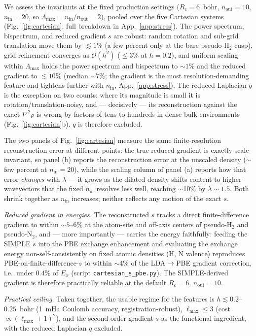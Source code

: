 \documentclass[aps,prb,reprint,superscriptaddress,nofootinbib]{revtex4-2}
\newcommand{\Rc}{R_{c}}
\newcommand{\nin}{n_{\mathrm{in}}}
\newcommand{\nout}{n_{\mathrm{out}}}
\begin{document}
We assess the invariants at the fixed production settings ($\Rc=6$~bohr, $\nout=10$,
$\nin=20$, so $\Lambda_{\max}=\nin/\nout=2$), pooled over the five Cartesian systems
(Fig.~\ref{fig:cartesian}; full breakdown in App.~\ref{app:stress}). The power spectrum,
bispectrum, and reduced gradient $s$ are robust: random rotation and sub-grid translation
move them by $\lesssim1\%$ (a few percent only at the bare pseudo-H$_2$ cusp), grid
refinement converges as $\mathcal O(h^2)$ ($\le3\%$ at $h=0.2$), and uniform scaling
within $\Lambda_{\max}$ holds the power spectrum and bispectrum to $\sim1\%$ and the
reduced gradient to $\lesssim10\%$ (median $\sim7\%$; the gradient is the most
resolution-demanding feature and tightens further with $\nin$, App.~\ref{app:stress}).
The reduced Laplacian $q$ is the exception on two counts: where its magnitude is small it
is rotation/translation-noisy, and --- decisively --- its reconstruction against the
exact $\nabla^2\rho$ is wrong by factors of tens to hundreds in dense bulk environments
(Fig.~\ref{fig:cartesian}b). $q$ is therefore excluded.

The two panels of Fig.~\ref{fig:cartesian} measure the same finite-resolution
reconstruction error at different points: the true reduced gradient is exactly
scale-invariant, so panel (b) reports the reconstruction error at the unscaled density
($\sim$few percent at $\nin=20$), while the scaling column of panel (a) reports how that
error \emph{changes} with $\lambda$ --- it grows as the dilated density shifts content to
higher wavevectors that the fixed $\nin$ resolves less well, reaching $\sim$10\% by
$\lambda\!\sim\!1.5$. Both shrink together as $\nin$ increases; neither reflects any
motion of the exact $s$.

\emph{Reduced gradient in energies.} The reconstructed $s$ tracks a direct
finite-difference gradient to within $\sim5$--$6\%$ at the atom-site and off-axis
centers of pseudo-H$_2$ and pseudo-N$_2$, and --- more importantly --- carries the
energy faithfully: feeding the SIMPLE $s$ into the PBE exchange enhancement and
evaluating the exchange energy non-self-consistently on fixed atomic densities (H,
N valence) reproduces PBE-on-finite-difference-$s$ to within $\sim4\%$ of the
LDA$\to$PBE gradient correction, i.e.\ under $0.4\%$ of $E_x$ (script
\texttt{cartesian\_s\_pbe.py}). The SIMPLE-derived gradient is therefore practically
reliable at the default $\Rc=6$, $\nout=10$.

\emph{Practical ceiling.} Taken together, the usable regime for the features is
$h\lesssim0.2$--$0.25$~bohr (1~mHa Coulomb accuracy, registration-robust),
$\ell_{\max}\le3$ (cost $\propto(\ell_{\max}+1)^2$), and the second-order gradient $s$
as the functional ingredient, with the reduced Laplacian $q$ excluded.
\end{document}
